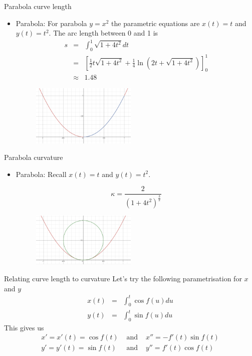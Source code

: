 \documentclass{beamer}
\begin{document}
\begin{frame}{Parabola curve length}
	\begin{itemize}	
			
			\item Parabola: For parabola $y=x^2$ the parametric equations are $x(t)=t$ and $y(t)=t^2$. The arc length between 0 and 1 is 
			\begin{eqnarray*}
				s &=& \int_{0}^{1} \sqrt{1+4t^2}dt \\ &=& \left[\frac{1}{2} t\sqrt{1+ 4 t^2} +\frac{1}{4} \ln \left(2 t+\sqrt{1+ 4 t^2} \right) \right]_{0}^1 \\
				&\approx&	 1.48
			\end{eqnarray*}
		
	\begin{figure}
		\centering
		\includegraphics[width=50mm, scale=0.4]{Parabola_Arc_Length.png}
	\end{figure}
	\end{itemize}
\end{frame}

\begin{frame}{Parabola curvature}
	\begin{itemize}	
		
		\item Parabola: Recall $x(t)=t$ and $y(t)=t^2$. 
		
		\[
		\kappa = \frac{2}{\left(1 + 4t^2 \right) ^ \frac{3}{2}}
		\]
		
	\begin{figure}
	\centering
	\includegraphics[width=50mm, scale=0.4]{Parabola.png}
\end{figure}

	\end{itemize}
\end{frame}

\begin{frame}{Relating curve length to curvature}
	Let's try the following parametrisation for $x$ and $y$
	\begin{eqnarray*}
		x(t) &=& \int_{0}^{t} \cos f(u) du \\
		y(t) &=& \int_{0}^{t} \sin f(u) du
	\end{eqnarray*}
	This gives us
	\begin{eqnarray*}
		x' = x'(t) = \cos f(t) &\mbox{ and }& x''=-f'(t) \sin f(t) \\
		y' = y'(t) = \sin f(t) &\mbox{ and }& y''=f'(t) \cos f(t)
	\end{eqnarray*}
\end{frame}
\end{document}
